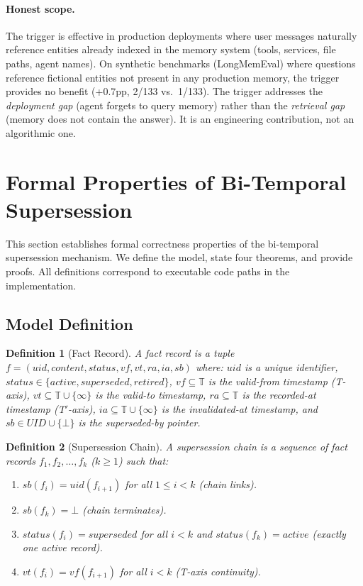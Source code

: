 \documentclass{article}
\newtheorem{definition}{Definition}
\begin{document}
\paragraph{Honest scope.}
The trigger is effective in production deployments where user messages naturally reference entities already indexed in the memory system (tools, services, file paths, agent names). On synthetic benchmarks (LongMemEval) where questions reference fictional entities not present in any production memory, the trigger provides no benefit (+0.7pp, 2/133 vs.\ 1/133). The trigger addresses the \emph{deployment gap} (agent forgets to query memory) rather than the \emph{retrieval gap} (memory does not contain the answer). It is an engineering contribution, not an algorithmic one.
\section{Formal Properties of Bi-Temporal Supersession}
\label{sec:formal}

This section establishes formal correctness properties of the bi-temporal supersession mechanism. We define the model, state four theorems, and provide proofs. All definitions correspond to executable code paths in the implementation.

\subsection{Model Definition}

\begin{definition}[Fact Record]
A \emph{fact record} is a tuple $f = (\mathit{uid}, \mathit{content}, \mathit{status}, \mathit{vf}, \mathit{vt}, \mathit{ra}, \mathit{ia}, \mathit{sb})$ where:
$\mathit{uid}$ is a unique identifier, $\mathit{status} \in \{\mathit{active}, \mathit{superseded}, \mathit{retired}\}$, $\mathit{vf} \subseteq \mathbb{T}$ is the \emph{valid-from} timestamp (T-axis), $\mathit{vt} \subseteq \mathbb{T} \cup \{\infty\}$ is the \emph{valid-to} timestamp, $\mathit{ra} \subseteq \mathbb{T}$ is the \emph{recorded-at} timestamp (T$'$-axis), $\mathit{ia} \subseteq \mathbb{T} \cup \{\infty\}$ is the \emph{invalidated-at} timestamp, and $\mathit{sb} \in \mathit{UID} \cup \{\bot\}$ is the \emph{superseded-by} pointer.
\end{definition}

\begin{definition}[Supersession Chain]
A \emph{supersession chain} is a sequence of fact records $f_1, f_2, \ldots, f_k$ ($k \geq 1$) such that:
\begin{enumerate}
\item $\mathit{sb}(f_i) = \mathit{uid}(f_{i+1})$ for all $1 \leq i < k$ (chain links).
\item $\mathit{sb}(f_k) = \bot$ (chain terminates).
\item $\mathit{status}(f_i) = \mathit{superseded}$ for all $i < k$ and $\mathit{status}(f_k) = \mathit{active}$ (exactly one active record).
\item $\mathit{vt}(f_i) = \mathit{vf}(f_{i+1})$ for all $i < k$ (T-axis continuity).
\end{enumerate}
\end{definition}
\end{document}
